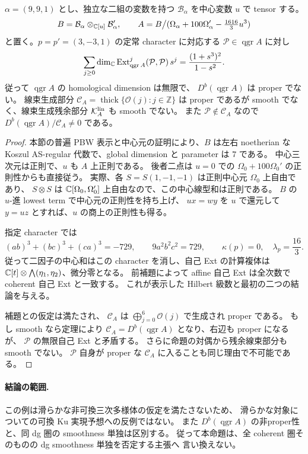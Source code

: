 \begin{proposition}
\label{cmo:prop:rational-singular}
$\alpha=(9,9,1)$ とし、独立な二組の変数を持つ
$\mathcal B_\alpha$ を中心変数 $u$ で tensor する。
\[
 B=\mathcal B_\alpha\otimes_{\mathbb C[u]}\mathcal B_\alpha',\qquad
 A=B\big/(\Omega_\alpha+100\Omega_\alpha'-\tfrac{1616}{3}u^3)
\]
と置く。$p=p'=(3,-3,1)$ の定常 character に対応する
$\mathcal P\in\operatorname{qgr}A$ に対し
\[
 \sum_{j\ge0}\dim_\mathbb C\operatorname{Ext}^j_{\operatorname{qgr}A}
       (\mathcal P,\mathcal P)\,s^j
 =\frac{(1+s^3)^2}{1-s^2}.
\]
従って $\operatorname{qgr}A$ の homological dimension は無限で、
$D^b(\operatorname{qgr}A)$ は proper でない。
線束生成部分 $\mathcal C_A=\operatorname{thick}\{\mathcal O(j):j\in\mathbb Z\}$ は
proper であるが smooth でなく、線束生成残余部分 $\mathcal K_A^{\rm lin}$ も smooth でない。
また $\mathcal P\notin\mathcal C_A$ なので
$D^b(\operatorname{qgr}A)/\mathcal C_A\ne0$ である。
\end{proposition}
\begin{proof}
本節の普遍 PBW 表示と中心元の証明により、$B$ は左右 noetherian な
Koszul AS-regular 代数で、global dimension と parameter は $7$ である。
中心三次元は正則で、$u$ も $A$ 上正則である。
後者二点は $u=0$ での $\Omega_0+100\Omega_0'$ の正則性からも直接従う。
実際、各 $S=S(1,-1,-1)$ は正則中心元 $\Omega_0$ 上自由であり、
$S\otimes S$ は $\mathbb C[\Omega_0,\Omega_0']$ 上自由なので、この中心線型和は正則である。
$B$ の $u$-進 lowest term で中心元の正則性を持ち上げ、
$u x=w y$ を $u$ で還元して $y=u z$ とすれば、$u$ の商上の正則性も得る。

指定 character では
\[
 (ab)^3+(bc)^3+(ca)^3=-729,\qquad
 9a^2b^2c^2=729,\qquad
 \kappa(p)=0,\quad\lambda_p=\frac{16}{3}.
\]
従って二因子の中心和はこの character を消し、自己 Ext の計算複体は
$\mathbb C[t]\otimes\bigwedge(\eta_1,\eta_2)$、微分零となる。
前補題によって affine 自己 Ext は全次数で coherent 自己 Ext と一致する。
これが表示した Hilbert 級数と最初の二つの結論を与える。

補題との仮定は満たされ、
$\mathcal C_A$ は $\bigoplus_{j=0}^6\mathcal O(j)$ で生成され proper である。
もし smooth なら定理により
$\mathcal C_A=D^b(\operatorname{qgr}A)$ となり、右辺も proper になるが、
$\mathcal P$ の無限自己 Ext と矛盾する。
さらに命題の対偶から残余線束部分も smooth でない。
$\mathcal P$ 自身が proper な $\mathcal C_A$ に入ることも同じ理由で不可能である。
\end{proof}

\paragraph{結論の範囲.}
この例は滑らかな非可換三次多様体の仮定を満たさないため、
滑らかな対象についての可換 Ku 実現予想への反例ではない。
また $D^b(\operatorname{qgr}A)$ の非proper性と、同 dg 圏の smoothness 単独は区別する。
従って本命題は、全 coherent 圏そのものの dg smoothness 単独を否定する主張へ
言い換えない。
